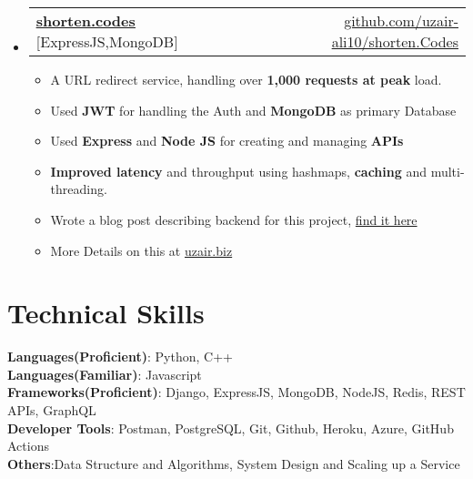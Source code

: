 \documentclass[letterpaper,11pt]{article}
\makeatletter
\newcommand{\resumeItem}[1]{
  \item\small{
    {#1 \vspace{-2pt}}
  }
}
\newcommand{\resumeProjectHeading}[2]{
    \item
    \begin{tabular*}{0.97\textwidth}{l@{\extracolsep{\fill}}r}
      \small#1 & #2 \\
    \end{tabular*}\vspace{-7pt}
}
\newcommand{\resumeSubHeadingListStart}{\begin{itemize}[leftmargin=0.15in, label={}]}
\newcommand{\resumeSubHeadingListEnd}{\end{itemize}}
\newcommand{\resumeItemListStart}{\begin{itemize}}
\newcommand{\resumeItemListEnd}{\end{itemize}\vspace{-5pt}}
\makeatother
\begin{document}
\resumeSubHeadingListStart
      \resumeProjectHeading
       {\textbf{\href{https://shorten.codes/}{\underline{shorten.codes}}}{          [ExpressJS,MongoDB]}}{\href{https://github.com/uzair-ali10/shorten.Codes/}{github.com/uzair-ali10/shorten.Codes}}
          \resumeItemListStart
           \resumeItem{A URL redirect service, handling over \textbf{1,000 requests at peak} load.}
           \resumeItem{Used \textbf{JWT} for handling the Auth and \textbf{MongoDB} as primary Database}
           \resumeItem{Used \textbf{Express} and \textbf{Node JS} for creating and managing \textbf{APIs}}
           \resumeItem{\textbf{Improved latency}  and throughput using hashmaps, \textbf{caching} and multi-threading.}
           \resumeItem{Wrote a blog post describing backend for this project, \href{https://medium.com/@uzair-ali10/building-backend-of-a-url-shortening-service-part-i-b3b834895900}{find it here}}
           \resumeItem{More Details on this at \href{https://uzair.biz/}{uzair.biz}}
          \resumeItemListEnd
    \resumeSubHeadingListEnd


%
\section{Technical Skills}
 \begin{itemize}[leftmargin=0.15in, label={}]
    \small{\item{
     \textbf{Languages(Proficient)}{: Python, C++} \\
      \textbf{Languages(Familiar)}{: Javascript} \\
     \textbf{Frameworks(Proficient)}{: Django, ExpressJS, MongoDB, NodeJS, Redis, REST APIs, GraphQL} \\
     \textbf{Developer Tools}{: Postman, PostgreSQL, Git, Github, Heroku, Azure, GitHub Actions} \\
     \textbf{Others}{:Data Structure and Algorithms, System Design and Scaling up a Service}\\
    }}
 \end{itemize}
\end{document}
